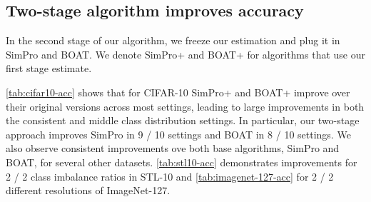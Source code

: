 





\subsection{Two-stage algorithm improves accuracy}

In the second stage of our algorithm, we freeze our estimation and plug it in SimPro and BOAT. We denote SimPro+ and BOAT+ for algorithms that use our first stage estimate.



\cref{tab:cifar10-acc} shows that for CIFAR-10 SimPro+ and BOAT+ improve over their original versions across most settings, leading to large improvements in both the consistent and middle class distribution settings. In particular, our two-stage approach improves SimPro in 9 / 10 settings and BOAT in 8 / 10 settings.
We also observe consistent improvements ove both base algorithms, SimPro and BOAT, for several other datasets. \cref{tab:stl10-acc} demonstrates improvements for 2 / 2 class imbalance ratios in STL-10 and \cref{tab:imagenet-127-acc} for 2 / 2  different resolutions of ImageNet-127. 


